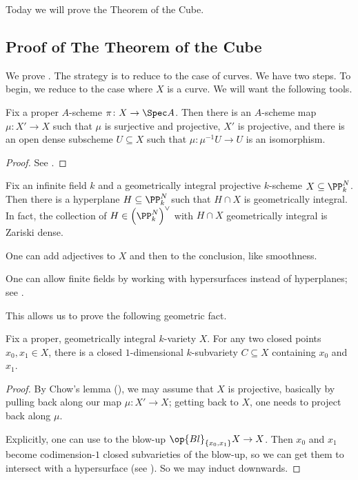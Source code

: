 \documentclass[../notes.tex]{subfiles}
\begin{document}
Today we will prove the Theorem of the Cube.

\subsection{Proof of The Theorem of the Cube}
We prove . The strategy is to reduce to the case of curves.
\cubethm*
\noindent We have two steps. To begin, we reduce to the case where $X$ is a curve. We will want the following tools.
\begin{theorem} \label{thm:chow}
	Fix a proper $A$-scheme $\pi\colon X\to\Spec A$. Then there is an $A$-scheme map $\mu\colon X'\to X$ such that $\mu$ is surjective and projective, $X'$ is projective, and there is an open dense subscheme $U\subseteq X$ such that $\mu\colon\mu^{-1}U\to U$ is an isomorphism.
\end{theorem}
\begin{proof}
	See \cite[Vakil~19.9.2]{rising-sea}.
\end{proof}
\begin{theorem}[Bertini] \label{thm:bertini}
	Fix an infinite field $k$ and a geometrically integral projective $k$-scheme $X\subseteq\PP^N_k$. Then there is a hyperplane $H\subseteq\PP^N_k$ such that $H\cap X$ is geometrically integral. In fact, the collection of $H\in\left(\PP^N_k\right)^\lor$ with $H\cap X$ geometrically integral is Zariski dense.
\end{theorem}
\begin{remark}
	One can add adjectives to $X$ and then to the conclusion, like smoothness.
\end{remark}
\begin{remark} \label{rem:finite-field-bertini}
	One can allow finite fields by working with hypersurfaces instead of hyperplanes; see \cite{charles-poonen-2017}.
\end{remark}
This allows us to prove the following geometric fact.
\begin{lemma}
	Fix a proper, geometrically integral $k$-variety $X$. For any two closed points $x_0,x_1\in X$, there is a closed $1$-dimensional $k$-subvariety $C\subseteq X$ containing $x_0$ and $x_1$.
\end{lemma}
\begin{proof}
	By Chow's lemma (), we may assume that $X$ is projective, basically by pulling back along our map $\mu\colon X'\to X$; getting back to $X$, one needs to project back along $\mu$.

	Explicitly, one can use  to the blow-up $\op{Bl}_{\{x_0,x_1\}}X\to X$. Then $x_0$ and $x_1$ become codimen\-sion-$1$ closed subvarieties of the blow-up, so we can get them to intersect with a hypersurface (see ). So we may induct downwards.
\end{proof}
\end{document}
